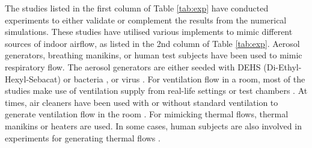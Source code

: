 \documentclass[a4paper,12pt]{elsarticle}
\begin{document}
The studies listed in the first column of Table \ref{tab:exp} have conducted experiments to either validate or complement the results from the numerical simulations. These studies have utilised various implements to mimic different sources of indoor airflow, as listed in the 2nd column of Table \ref{tab:exp}. Aerosol generators, breathing manikins, or human test subjects have been used to mimic respiratory flow. The aerosol generators are either seeded with DEHS (Di-Ethyl-Hexyl-Sebacat) \cite{jain2023numerical} or bacteria \cite{liu2020full}, or virus \cite{oksanen2022combining}. For ventilation flow in a room, most of the studies make use of ventilation supply from real-life settings \cite{romano2015numerical,duill2021impact} or test chambers \cite{zhang2019distribution, berrouk2010experimental}. At times, air cleaners have been used with or without standard ventilation to generate ventilation flow in the room \cite{oksanen2022combining, jain2023numerical}. For mimicking thermal flows, thermal manikins \cite{li2021effects} or heaters \cite{ho2021modeling} are used. In some cases, human subjects are also involved in experiments for generating thermal flows \cite{li2005role, deng2021control}.
\end{document}
